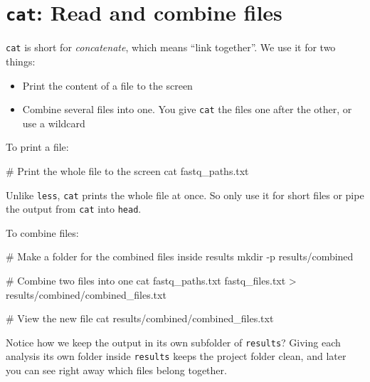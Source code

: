 \documentclass[
  letterpaper,
  DIV=11,
  numbers=noendperiod]{scrreprt}
\newenvironment{Shaded}{}{}
\newcommand{\AttributeTok}[1]{\textcolor[rgb]{0.84,0.23,0.29}{#1}}
\newcommand{\CommentTok}[1]{\textcolor[rgb]{0.42,0.45,0.49}{#1}}
\newcommand{\FunctionTok}[1]{\textcolor[rgb]{0.44,0.26,0.76}{#1}}
\newcommand{\NormalTok}[1]{\textcolor[rgb]{0.14,0.16,0.18}{#1}}
\newcommand{\OperatorTok}[1]{\textcolor[rgb]{0.14,0.16,0.18}{#1}}
\providecommand{\tightlist}{%
  \setlength{\itemsep}{0pt}\setlength{\parskip}{0pt}}
\begin{document}
\section{\texorpdfstring{\texttt{cat}: Read and combine
files}{cat: Read and combine files}}\label{cat-read-and-combine-files}

\texttt{cat} is short for \emph{concatenate}, which means ``link
together''. We use it for two things:

\begin{itemize}
\tightlist
\item
  Print the content of a file to the screen
\item
  Combine several files into one. You give \texttt{cat} the files one
  after the other, or use a wildcard
\end{itemize}

To print a file:

\begin{Shaded}
\begin{Highlighting}[]
\CommentTok{\# Print the whole file to the screen}
\FunctionTok{cat}\NormalTok{ fastq\_paths.txt}
\end{Highlighting}
\end{Shaded}

Unlike \texttt{less}, \texttt{cat} prints the whole file at once. So
only use it for short files or pipe the output from \texttt{cat} into
\texttt{head}.

To combine files:

\begin{Shaded}
\begin{Highlighting}[]
\CommentTok{\# Make a folder for the combined files inside results}
\FunctionTok{mkdir} \AttributeTok{{-}p}\NormalTok{ results/combined}

\CommentTok{\# Combine two files into one}
\FunctionTok{cat}\NormalTok{ fastq\_paths.txt fastq\_files.txt }\OperatorTok{\textgreater{}}\NormalTok{ results/combined/combined\_files.txt}

\CommentTok{\# View the new file}
\FunctionTok{cat}\NormalTok{ results/combined/combined\_files.txt}
\end{Highlighting}
\end{Shaded}

Notice how we keep the output in its own subfolder of \texttt{results}?
Giving each analysis its own folder inside \texttt{results} keeps the
project folder clean, and later you can see right away which files
belong together.
\end{document}
